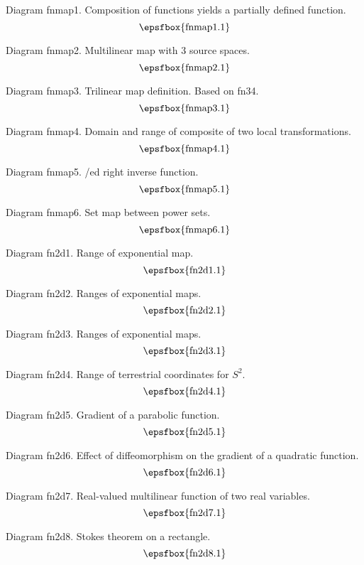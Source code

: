 \secteject
\edef\SECTfnmap{\the\pageno}

Diagram fnmap1. Composition of functions yields a partially defined function.
$$
\centerline{\epsfbox{fnmap1.1}}
$$

Diagram fnmap2. Multilinear map with 3 source spaces.
$$
\centerline{\epsfbox{fnmap2.1}}
$$

Diagram fnmap3. Trilinear map definition. Based on fn34.
$$
\centerline{\epsfbox{fnmap3.1}}
$$

Diagram fnmap4. Domain and range of composite of two local transformations.
$$
\centerline{\epsfbox{fnmap4.1}}
$$

\filleject

Diagram fnmap5. \Generalis/ed right inverse function.
$$
\centerline{\epsfbox{fnmap5.1}}
$$

Diagram fnmap6. Set map between power sets.
$$
\centerline{\epsfbox{fnmap6.1}}
$$

\secteject
\edef\SECTfnTWOd{\the\pageno}

Diagram fn2d1. Range of exponential map.
$$
\centerline{\epsfbox{fn2d1.1}}
$$

Diagram fn2d2. Ranges of exponential maps.
$$
\centerline{\epsfbox{fn2d2.1}}
$$

Diagram fn2d3. Ranges of exponential maps.
$$
\centerline{\epsfbox{fn2d3.1}}
$$

\filleject

Diagram fn2d4. Range of terrestrial coordinates for $S^2$.
$$
\centerline{\epsfbox{fn2d4.1}}
$$

Diagram fn2d5. Gradient of a parabolic function.
$$
\centerline{\epsfbox{fn2d5.1}}
$$

Diagram fn2d6. Effect of diffeomorphism on the gradient of a quadratic function.
$$
\centerline{\epsfbox{fn2d6.1}}
$$

\filleject

Diagram fn2d7. Real-valued multilinear function of two real variables.
$$
\centerline{\epsfbox{fn2d7.1}}
$$

Diagram fn2d8. Stokes theorem on a rectangle.
$$
\centerline{\epsfbox{fn2d8.1}}
$$

